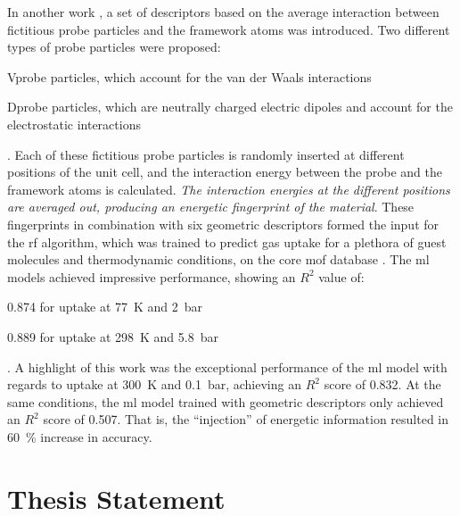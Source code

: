 In another work \parencite{generic}, a set of descriptors based on the average
interaction between fictitious probe particles and the
framework atoms was introduced. Two different types of probe particles were
proposed:
\begin{enumerate*}[label=\roman*).]
	\item Vprobe particles, which account for the van der Waals
		interactions
	\item Dprobe particles, which are neutrally charged electric dipoles and
		account for the electrostatic interactions
\end{enumerate*}.
Each of these fictitious probe particles is randomly inserted at different
positions of the unit cell, and the interaction energy between
the probe and the framework atoms is calculated. \emph{The interaction energies at the
different positions are averaged out, producing an energetic
fingerprint of the material}. These fingerprints in
combination with six geometric descriptors formed the input for the
\gls{rf} algorithm, which was trained to predict gas
uptake for a plethora of guest molecules
and thermodynamic conditions, on the
\gls{core} \gls{mof} database \parencite{chong47}. The
\gls{ml} models achieved impressive performance, showing an $R^2$ value of:
\begin{enumerate*}[label=\roman*).]
	\item \num{0.874} for  uptake at \SI{77}{\kelvin} and \SI{2}{\bar}
	\item \num{0.889} for  uptake at \SI{298}{\kelvin} and
		\SI{5.8}{\bar}
\end{enumerate*}.
A highlight of this work was the exceptional performance of the \gls{ml} model
with regards to  uptake at \SI{300}{\kelvin} and \SI{0.1}{\bar},
achieving an $R^2$ score of \num{0.832}. At the same conditions, the \gls{ml}
model trained with geometric descriptors only achieved an $R^2$ score of
\num{0.507}. That is, the ``injection'' of energetic information resulted in
\SI{60}{\percent} increase in accuracy.

\section{Thesis Statement}


